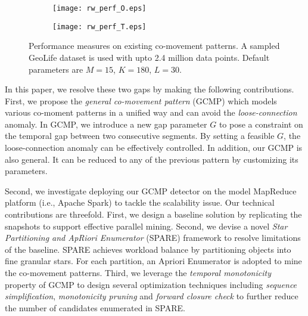 \begin{figure}[h]
    \centering
    \begin{subfigure}[b]{0.45\textwidth}
            \centering
            \texttt{[image: rw\_perf\_O.eps]}
    \label{fig:fig1}
    \end{subfigure}
    \begin{subfigure}[b]{0.45\textwidth}
            \centering
            \texttt{[image: rw\_perf\_T.eps]}
    \label{fig:fig2}
    \end{subfigure}
    \caption{Performance measures on existing co-movement patterns. A sampled GeoLife dataset
    is used with upto 2.4 million data points. Default parameters are $M=15$, $K=180$, $L=30$.}
    \label{fig:related_work_scalability}
\end{figure}
%
%
%
In this paper, we resolve these two gaps by making the following contributions.
First, we propose the \emph{general co-movement pattern} (GCMP) which models
various co-moment patterns in a unified way and can avoid 
the \emph{loose-connection} anomaly. In GCMP,
we introduce a new gap parameter $G$ to pose a constraint on the temporal gap between two consecutive segments. 
By setting a feasible $G$, the loose-connection anomaly can be effectively controlled. In addition, our GCMP is also general. It can be reduced to any of the previous pattern by customizing its parameters.

Second, we investigate deploying our GCMP detector on the model MapReduce platform (i.e., Apache Spark) to tackle the scalability issue. Our technical contributions are threefold. First, we design a baseline solution by replicating the snapshots 
to support effective parallel mining. 
Second, we devise a novel \emph{Star Partitioning and ApRiori Enumerator} (SPARE) framework to resolve limitations of the baseline. 
SPARE achieves workload balance by partitioning objects into fine granular stars. 
For each partition, an Apriori Enumerator is adopted to mine the co-movement patterns. 
Third, we leverage the \emph{temporal monotonicity} property of GCMP 
to design several optimization techniques including \emph{sequence simplification}, \emph{monotonicity pruning} and \emph{forward closure check} to further reduce the number of candidates enumerated in SPARE.

